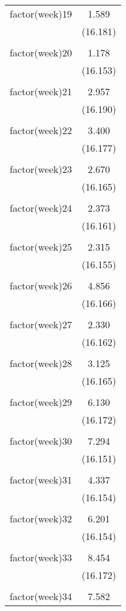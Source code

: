 \documentclass{article}
\begin{document}
\begin{table}[!htbp]
\begin{tabular}{@{\extracolsep{5pt}}lc}
 factor(week)19 & 1.589 \\ 
  & (16.181) \\ 
  & \\ 
 factor(week)20 & 1.178 \\ 
  & (16.153) \\ 
  & \\ 
 factor(week)21 & 2.957 \\ 
  & (16.190) \\ 
  & \\ 
 factor(week)22 & 3.400 \\ 
  & (16.177) \\ 
  & \\ 
 factor(week)23 & 2.670 \\ 
  & (16.165) \\ 
  & \\ 
 factor(week)24 & 2.373 \\ 
  & (16.161) \\ 
  & \\ 
 factor(week)25 & 2.315 \\ 
  & (16.155) \\ 
  & \\ 
 factor(week)26 & 4.856 \\ 
  & (16.166) \\ 
  & \\ 
 factor(week)27 & 2.330 \\ 
  & (16.162) \\ 
  & \\ 
 factor(week)28 & 3.125 \\ 
  & (16.165) \\ 
  & \\ 
 factor(week)29 & 6.130 \\ 
  & (16.172) \\ 
  & \\ 
 factor(week)30 & 7.294 \\ 
  & (16.151) \\ 
  & \\ 
 factor(week)31 & 4.337 \\ 
  & (16.154) \\ 
  & \\ 
 factor(week)32 & 6.201 \\ 
  & (16.154) \\ 
  & \\ 
 factor(week)33 & 8.454 \\ 
  & (16.172) \\ 
  & \\ 
 factor(week)34 & 7.582 \\ 

\end{tabular}
\end{table}
\end{document}
